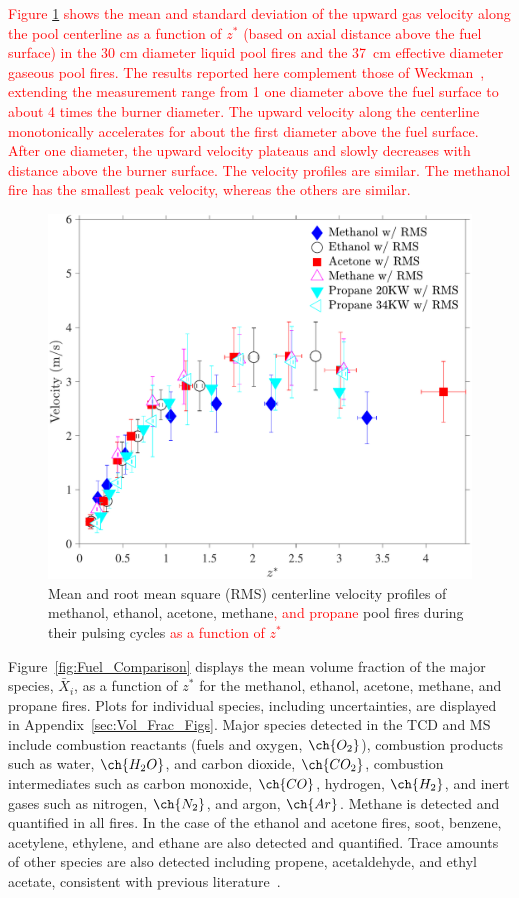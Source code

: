 \documentclass[12pt]{article}
\begin{document}
\textcolor{red}{Figure \ref{fig:Vel_Comparison} shows the mean and standard deviation of the upward gas velocity along the pool centerline as a function of $z^*$ (based on axial distance above the fuel surface) in the 30 cm diameter liquid pool fires and the 37~cm effective diameter gaseous pool fires. The results reported here complement those of Weckman~\cite{Weckman1996}, extending the measurement range from 1 one diameter above the fuel surface to about 4 times the burner diameter.  The upward velocity along the centerline monotonically accelerates for about the first diameter above the fuel surface.  After one diameter, the upward velocity plateaus and slowly decreases with distance above the burner surface.    The velocity profiles are similar. The methanol fire has the smallest peak velocity, whereas the others are similar.}


\begin{figure}[h!]
	\centering
\includegraphics[width=10.0 cm, keepaspectratio]{Velocity_Comparison.pdf}
	\caption[Mean and RMS centerline velocity profiles]{Mean and root mean square (RMS) centerline velocity profiles of methanol, ethanol, acetone, methane\textcolor{red}{, and propane} pool fires during their pulsing cycles \textcolor{red}{ as a function of $z^*$}}
	\label{fig:Vel_Comparison}
\end{figure}

Figure~\ref{fig:Fuel_Comparison} displays the mean volume fraction of the major species, $\bar{X}_{i}$, as a function of $z^*$ for the methanol, ethanol, acetone, methane, and propane fires. Plots for individual species, including uncertainties, are displayed in Appendix~\ref{sec:Vol_Frac_Figs}. Major species detected in the TCD and MS include combustion reactants (fuels and oxygen, $\ch{O_2}$), combustion products such as water, $\ch{H_{2}O}$, and carbon dioxide, $\ch{CO_{2}}$, combustion intermediates such as carbon monoxide, $\ch{CO}$, hydrogen, $\ch{H_{2}}$, and inert gases such as nitrogen, $\ch{N_{2}}$, and argon, $\ch{Ar}$. Methane is detected and quantified in all fires. In the case of the ethanol and acetone fires, soot, benzene, acetylene, ethylene, and ethane are also detected and quantified. Trace amounts of other species are also detected including propene, acetaldehyde, and ethyl acetate, consistent with previous literature~\cite{Pichon2009, Gong2015}.
\end{document}
